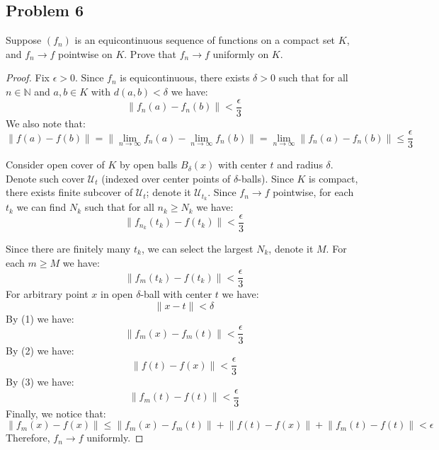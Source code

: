 \documentclass{article}
\begin{document}
\subsection*{Problem 6}

\begin{tcolorbox}
Suppose $(f_n)$ is an equicontinuous sequence of functions on a compact set $K$, and $f_n \to f$ pointwise on $K$. Prove that $f_n \to f$ uniformly on $K$.
\end{tcolorbox}
\begin{proof}
Fix $\epsilon>0$. Since $f_n$ is equicontinuous, there exists $\delta>0$ such that for all $n \in \mathbb{N}$ and $a, b \in K$ with $d(a,b)<\delta$ we have:
\begin{equation}
\lVert f_n(a) - f_n(b) \rVert < \frac{\epsilon}{3}
\end{equation}
We also note that:
\begin{equation}
\lVert f(a) - f(b) \rVert
= \lVert \lim_{n\to\infty} f_n(a) - \lim_{n\to\infty} f_n(b) \rVert 
= \lim_{n\to\infty} \lVert f_n(a) - f_n(b) \rVert
\leq \frac{\epsilon}{3}
\end{equation}

Consider open cover of $K$ by open balls $B_\delta(x)$ with center $t$ and radius $\delta$. Denote such cover $\mathcal{U}_t$ (indexed over center points of $\delta$-balls). Since $K$ is compact, there exists finite subcover of $\mathcal{U}_t$; denote it $\mathcal{U}_{t_k}$. Since $f_n \to f$ pointwise, for each $t_k$ we can find $N_k$ such that for all $n_k \geq N_k$ we have:
$$ \lVert f_{n_k}(t_k) - f(t_k) \rVert < \frac{\epsilon}{3} $$

Since there are finitely many $t_k$, we can select the largest $N_k$, denote it $M$. For each $m \geq M$ we have:
\begin{equation}
\lVert f_m(t_k) - f(t_k) \rVert < \frac{\epsilon}{3}
\end{equation}
For arbitrary point $x$ in open $\delta$-ball with center $t$ we have:
$$ \lVert x - t \rVert < \delta $$
By (1) we have:
$$ \lVert f_m(x) - f_m(t) \rVert < \frac{\epsilon}{3} $$
By (2) we have:
$$ \lVert f(t) - f(x) \rVert < \frac{\epsilon}{3} $$
By (3) we have:
$$ \lVert f_m(t) - f(t) \rVert < \frac{\epsilon}{3} $$
Finally, we notice that:
$$ \lVert f_m(x) - f(x) \rVert 
\leq
\lVert f_m(x) - f_m(t) \rVert 
+ \lVert f(t) - f(x) \rVert 
+ \lVert f_m(t) - f(t) \rVert
<
\epsilon
$$
Therefore, $f_n \to f$ uniformly.

\end{proof}
\end{document}
